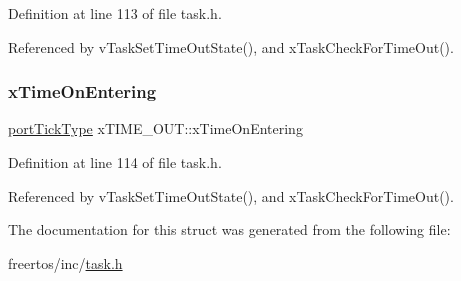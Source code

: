 Definition at line 113 of file task.\+h.



Referenced by v\+Task\+Set\+Time\+Out\+State(), and x\+Task\+Check\+For\+Time\+Out().

\mbox{\label{structxTIME__OUT_a8342bf2057b33c50205da6a19d9caa1c}} 
\subsubsection{\texorpdfstring{x\+Time\+On\+Entering}{xTimeOnEntering}}
{\footnotesize\ttfamily \hyperlink{portmacro_8h_a4d746b2ff8fafc490b764c66411ec457}{port\+Tick\+Type} x\+T\+I\+M\+E\+\_\+\+O\+U\+T\+::x\+Time\+On\+Entering}



Definition at line 114 of file task.\+h.



Referenced by v\+Task\+Set\+Time\+Out\+State(), and x\+Task\+Check\+For\+Time\+Out().



The documentation for this struct was generated from the following file\+:\begin{DoxyCompactItemize}
\item 
freertos/inc/\hyperlink{task_8h}{task.\+h}\end{DoxyCompactItemize}
